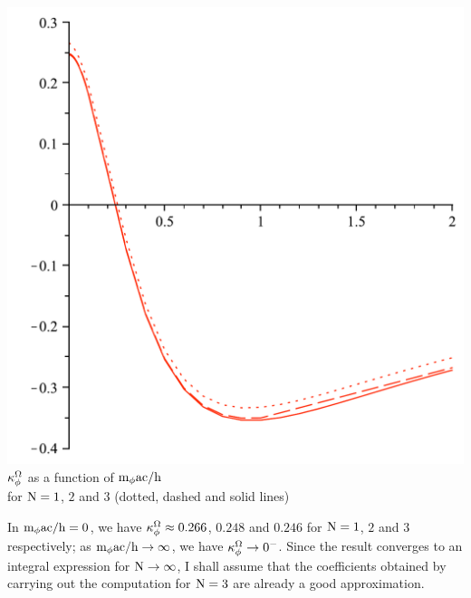 \documentclass[10pt,a4paper,twoside,openany]{book}
\begin{document}
\begin{center}
\includegraphics[scale=0.4]{images/graphics/Vacuum_Energy_2.pdf}\\
\small{$\kappa^\Omega_\phi$ as a function of $\mathrm m_{\phi} \mathrm a \mathrm c / \mathrm h$\\
for $\mathrm N = 1$, $2$ and $3$ (dotted, dashed and solid lines)}
\end{center}
In $\mathrm m_{\phi} \mathrm a \mathrm c / \mathrm h = 0$, we have $\kappa^\Omega_\phi \approx 0.266$, $0.248$ and $0.246$ for $\mathrm N = 1$, $2$ and $3$ respectively; as $\mathrm m_{\phi} \mathrm a \mathrm c / \mathrm h \to \infty$, we have $\kappa^\Omega_\phi \to 0^-$. Since the result converges to an integral expression for $\mathrm N \to \infty$, I shall assume that the coefficients obtained by carrying out the computation for $\mathrm N = 3$ are already a good approximation.
\end{document}
